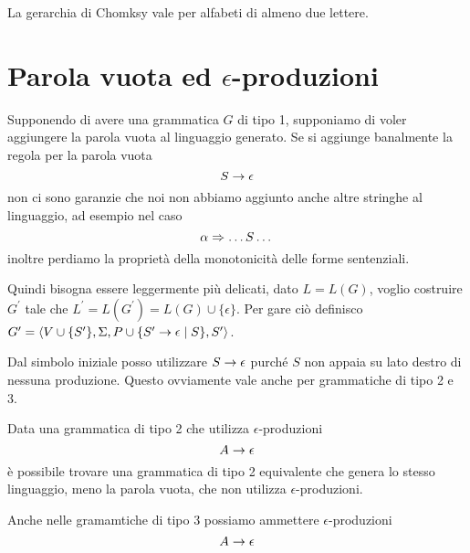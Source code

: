 \documentclass[12pt]{article}
\begin{document}
\tableofcontents
\newpage
La gerarchia di Chomksy vale per alfabeti di almeno due lettere.

\section{Parola vuota ed $\epsilon$-produzioni}
Supponendo di avere una grammatica $G$ di tipo 1, supponiamo di voler aggiungere la parola vuota al linguaggio generato.
Se si aggiunge banalmente la regola per la parola vuota
$$ S \rightarrow \epsilon $$
non ci sono garanzie che noi non abbiamo aggiunto anche altre stringhe al linguaggio, ad esempio nel caso
$$ \alpha \Rightarrow \dots S \dots $$
inoltre perdiamo la proprietà della monotonicità delle forme sentenziali.

Quindi bisogna essere leggermente più delicati, dato $L = L(G)$, voglio costruire $G^\prime$ tale che $L^\prime = L(G^\prime) = L(G) \cup \{ \epsilon \}$.
Per gare ciò definisco $G^\prime = \langle V \cup \{S^\prime\}, \Sigma, P \cup \{ S^\prime \rightarrow \epsilon \mid S\}, S^\prime \rangle$.

Dal simbolo iniziale posso utilizzare $S \rightarrow \epsilon$ purché $S$ non appaia su lato destro di nessuna produzione.
Questo ovviamente vale anche per grammatiche di tipo 2 e 3.

Data una grammatica di tipo 2 che utilizza $\epsilon$-produzioni 
$$ A \rightarrow \epsilon $$
è possibile trovare una grammatica di tipo 2 equivalente che genera lo stesso linguaggio, meno la parola vuota, che non utilizza $\epsilon$-produzioni.

Anche nelle gramamtiche di tipo 3 possiamo ammettere $\epsilon$-produzioni
$$ A \rightarrow \epsilon $$
\end{document}
